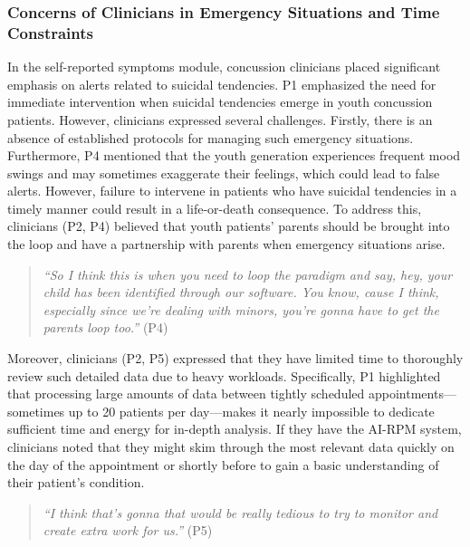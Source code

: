 \subsubsection{Concerns of Clinicians in Emergency Situations and Time Constraints}
In the self-reported symptoms module, concussion clinicians placed significant emphasis on alerts related to suicidal tendencies. P1 emphasized the need for immediate intervention when suicidal tendencies emerge in youth concussion patients. 
However, clinicians expressed several challenges. 
Firstly, there is an absence of established protocols for managing such emergency situations. 
Furthermore, P4 mentioned that the youth generation experiences frequent mood swings and may sometimes exaggerate their feelings, which could lead to false alerts.
However, failure to intervene in patients who have suicidal tendencies in a timely manner could result in a life-or-death consequence. 
To address this, clinicians (P2, P4) believed that youth patients' parents should be brought into the loop and have a partnership with parents when emergency situations arise.
\begin{quote}
    \textit{``So I think this is when you need to loop the paradigm and say, hey, your child has been identified through our software. You know, cause I think, especially since we're dealing with minors, you're gonna have to get the parents loop too.''} (P4)
\end{quote}
Moreover, clinicians (P2, P5) expressed that they have limited time to thoroughly review such detailed data due to heavy workloads.
Specifically, P1 highlighted that processing large amounts of data between tightly scheduled appointments—sometimes up to 20 patients per day—makes it nearly impossible to dedicate sufficient time and energy for in-depth analysis. 
If they have the AI-RPM system, clinicians noted that they might skim through the most relevant data quickly on the day of the appointment or shortly before to gain a basic understanding of their patient’s condition.
\begin{quote}
    \textit{``I think that's gonna that would be really  tedious to try to monitor and create extra work for us.''} (P5)
\end{quote}








